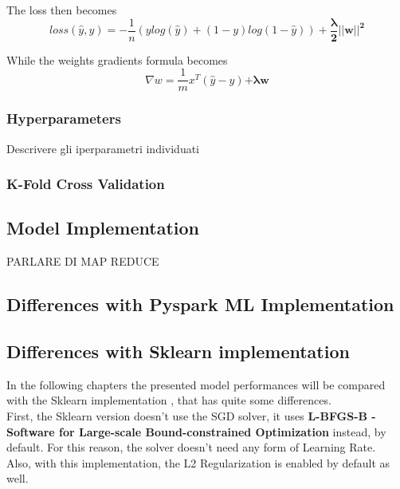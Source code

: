 \documentclass[
	letterpaper, %
	10pt, %
]{class}
\begin{document}
The loss then becomes
$$ loss(\hat{y}, y) = -\frac{1}{n}(y log(\hat{y}) + (1-y)log(1-\hat{y})) + \boldsymbol{\frac{\lambda}{2}||w||^2} $$

While the weights gradients formula becomes
$$ \nabla w = \frac{1}{m}x^T(\hat{y} - y) \boldsymbol{+ \lambda w} $$

\subsubsection{Hyperparameters}
Descrivere gli iperparametri individuati

\subsubsection{K-Fold Cross Validation}

\subsection{Model Implementation}
PARLARE DI MAP REDUCE

\subsection{Differences with Pyspark ML Implementation}

\subsection{Differences with Sklearn implementation}

In the following chapters the presented model performances will be compared with the Sklearn implementation \cite{logisticsklearn}, that has quite some differences.\\
First, the Sklearn version doesn't use the SGD solver, it uses \textbf{L-BFGS-B - Software for Large-scale Bound-constrained Optimization} \cite{lbfgsb} instead, by default.
For this reason, the solver doesn't need any form of Learning Rate.\\
Also, with this implementation, the L2 Regularization is enabled by default as well.
\end{document}
